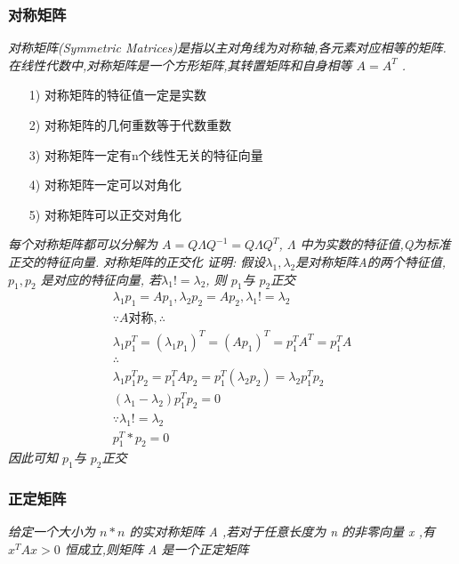 \documentclass{scrartcl}
\numberwithin{equation}{section}
\begin{document}
\subsubsection{对称矩阵}
\textsl{
    对称矩阵(Symmetric Matrices)是指以主对角线为对称轴,各元素对应相等的矩阵. 在线性代数中,对称矩阵是一个方形矩阵,其转置矩阵和自身相等 $ A = A^T $ .
}
\begin{itemize}\item [1)] 对称矩阵的特征值一定是实数 \item [2)] 对称矩阵的几何重数等于代数重数\item [3)] 对称矩阵一定有n个线性无关的特征向量\item [4)] 对称矩阵一定可以对角化\item [5)] 对称矩阵可以正交对角化\end{itemize}
\textsl{ 每个对称矩阵都可以分解为 $ A = Q \Lambda Q^{-1} = Q \Lambda Q^{T} $, $ \Lambda $ 中为实数的特征值,Q为标准正交的特征向量. }
\textsl{对称矩阵的正交化
    证明: 假设$ \lambda_1, \lambda_2 $是对称矩阵A的两个特征值,$ p_1, p_2 $ 是对应的特征向量, 若$ \lambda_1 != \lambda_2 $, 则 $ p_1 $与 $ p_2 $正交}
\begin{equation}
    \begin{aligned}
        \lambda_1 p_1 = A p_1 , \lambda_2 p_2 = A p_2, \lambda_1 != \lambda_2           \\
        \because A对称, \therefore                                                      \\
        \lambda_1 p_1^T = (\lambda_1 p_1)^T = (A p_1)^T = p_1^T A^T = p_1^T A           \\
        \therefore                                                                      \\
        \lambda_1 p_1^T p_2 = p_1^T A p_2 = p_1^T (\lambda_2 p_2) = \lambda_2 p_1^T p_2 \\
        (\lambda_1 - \lambda_2) p_1^T p_2 = 0                                           \\
        \because    \lambda_1 != \lambda_2                                              \\
        p_1^T * p_2 =0
    \end{aligned}
\end{equation}
\textsl{
    因此可知 $p_1$与 $p_2$正交
}
\subsubsection{正定矩阵}
\textsl{
    给定一个大小为 $ n*n $ 的实对称矩阵 A ,若对于任意长度为 n 的非零向量 x ,有 $ x^T A x>0 $ 恒成立,则矩阵 A 是一个正定矩阵}
\end{document}
